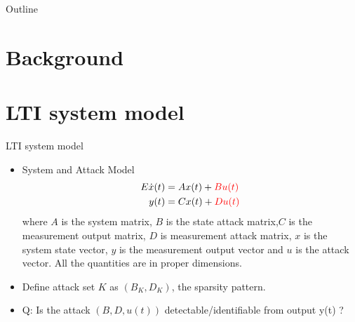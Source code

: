 \documentclass{beamer}
\title{}
\author{Zhongbin Huang}
\date{Oct 26, 2017}
\begin{document}
	
	\begin{frame}
	\titlepage
\end{frame}

 \begin{frame}{Outline}
   \tableofcontents
 \end{frame}

\section{Background}

\section{LTI system model}

\begin{frame}{LTI system model}
\begin{itemize}
\item {System and Attack Model %
	\begin{equation}
	\begin{aligned}
	E\dot x(t) &= Ax(t) +{\color{red}B u(t)} \\
	y(t)&=Cx(t) + {\color{red}D u(t)}\\
	\end{aligned}
	\end{equation}}
where $A$ is the system matrix, $B$ is the state attack matrix,$C$ is the measurement output matrix, $D$ is measurement attack matrix, $x$ is the system state vector, $y$ is the measurement output vector and $u$ is the attack vector. All the quantities are in proper dimensions.
\item Define {\color{red}attack set} $K$ as $(B_K,D_K)$, the sparsity pattern.
\item Q: Is the attack $(B,D,u(t))$ detectable/identifiable from output y(t) ?
\end{itemize}
\end{frame}
\end{document}
